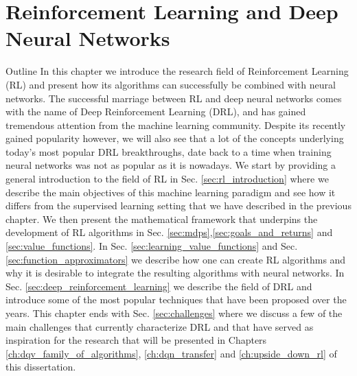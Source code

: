 \chapter{Reinforcement Learning and Deep Neural Networks}
\label{ch:reinforcement_learning}


\begin{remark}{Outline}
In this chapter we introduce the research field of Reinforcement Learning (RL) and present how its algorithms can successfully be combined with neural networks. The successful marriage between RL and deep neural networks comes with the name of Deep Reinforcement Learning (DRL), and has gained tremendous attention from the machine learning community. Despite its recently gained popularity however, we will also see that a lot of the concepts underlying today's most popular DRL breakthroughs, date back to a time when training neural networks was not as popular as it is nowadays. We start by providing a general introduction to the field of RL in Sec. \ref{sec:rl_introduction} where we describe the main objectives of this machine learning paradigm and see how it differs from the supervised learning setting that we have described in the previous chapter. We then present the mathematical framework that underpins the development of RL algorithms in Sec. \ref{sec:mdps},\ref{sec:goals_and_returns} and \ref{sec:value_functions}. In Sec. \ref{sec:learning_value_functions} and Sec. \ref{sec:function_approximators} we describe how one can create RL algorithms and why it is desirable to integrate the resulting algorithms with neural networks. In Sec. \ref{sec:deep_reinforcement_learning} we describe the field of DRL and introduce some of the most popular techniques that have been proposed over the years. This chapter ends with Sec. \ref{sec:challenges} where we discuss a few of the main challenges that currently characterize DRL and that have served as inspiration for the research that will be presented in Chapters \ref{ch:dqv_family_of_algorithms}, \ref{ch:dqn_transfer} and \ref{ch:upside_down_rl} of this dissertation.

\end{remark}

